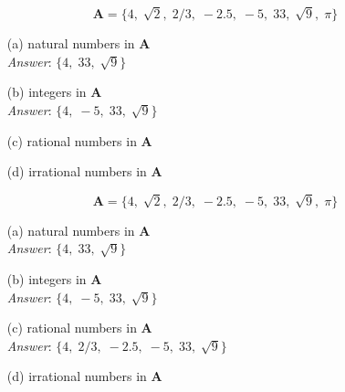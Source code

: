 \documentclass[11pt,a4paper,titlepage,oneside,openany]{article}
\numberwithin{equation}{section}
\numberwithin{algorithm}{section}
\numberwithin{figure}{section}
\numberwithin{table}{section}
\begin{document}
{%
\[\boldsymbol{A} = \{4,\; \sqrt{2},\; 2/3,\; -2.5,\; -5,\; 33,\; \sqrt{9},\; \pi \}\]
\begin{itemize}
\item[(a)] natural numbers in \textbf{A}\\
\hspace{1cm} \textit{Answer}: $\{4,\; 33,\; \sqrt{9}\}$
\item[(b)] integers in \textbf{A}\\
\hspace{1cm} \textit{Answer}: $\{4,\; -5,\; 33,\; \sqrt{9}\}$
\item[(c)] rational numbers in \textbf{A}\\
\item[(d)] irrational numbers in \textbf{A}\\
\end{itemize}




\[\boldsymbol{A} = \{4,\; \sqrt{2},\; 2/3,\; -2.5,\; -5,\; 33,\; \sqrt{9},\; \pi \}\]
\begin{itemize}
\item[(a)] natural numbers in \textbf{A}\\
\hspace{1cm} \textit{Answer}: $\{4,\; 33,\; \sqrt{9}\}$
\item[(b)] integers in \textbf{A}\\
\hspace{1cm} \textit{Answer}: $\{4,\; -5,\; 33,\; \sqrt{9}\}$
\item[(c)] rational numbers in \textbf{A}\\
\hspace{1cm} \textit{Answer}: $\{4,\; 2/3,\; -2.5,\; -5,\; 33,\; \sqrt{9}\}$
\item[(d)] irrational numbers in \textbf{A}\\
\end{itemize}


}
\end{document}

